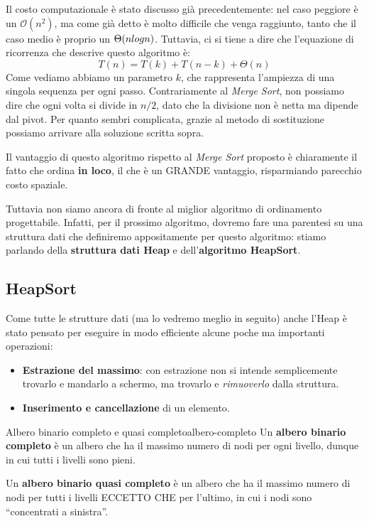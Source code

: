 \documentclass[12pt]{report}
\begin{document}
    Il costo computazionale è stato discusso già precedentemente: nel caso peggiore è un $\mathcal{O}(n^2)$, ma come già detto è molto difficile che venga raggiunto, tanto che il caso medio è proprio un $\Theta(n \\log n)$. Tuttavia, ci si tiene a dire che l'equazione di ricorrenza che descrive questo algoritmo è:
    \[
    T(n) = T(k) + T(n-k) + \Theta(n)
    \]
    Come vediamo abbiamo un parametro $k$, che rappresenta l'ampiezza di una singola sequenza per ogni passo. Contrariamente al \textit{Merge Sort}, non possiamo dire che ogni volta si divide in $n/2$, dato che la divisione non è netta ma dipende dal pivot. Per quanto sembri complicata, grazie al metodo di sostituzione possiamo arrivare alla soluzione scritta sopra.
    
    Il vantaggio di questo algoritmo rispetto al \textit{Merge Sort} proposto è chiaramente il fatto che ordina \textbf{in loco}, il che è un GRANDE vantaggio, risparmiando parecchio costo spaziale.
    
    Tuttavia non siamo ancora di fronte al miglior algoritmo di ordinamento progettabile. Infatti, per il prossimo algoritmo, dovremo fare una parentesi su una struttura dati che definiremo appositamente per questo algoritmo: stiamo parlando della \textbf{struttura dati Heap} e dell’\textbf{algoritmo HeapSort}.
    
    \subsection{HeapSort}
    Come tutte le strutture dati (ma lo vedremo meglio in seguito) anche l'Heap è stato pensato per eseguire in modo efficiente alcune poche ma importanti operazioni:
    \begin{itemize}
    	\item \textbf{Estrazione del massimo}: con estrazione non si intende semplicemente trovarlo e mandarlo a schermo, ma trovarlo e \textit{rimuoverlo} dalla struttura.
    	\item \textbf{Inserimento e cancellazione} di un elemento.
    \end{itemize}
    
    \begin{definizione}{Albero binario completo e quasi completo}{albero-completo}
    	Un \textbf{albero binario completo} è un albero che ha il massimo numero di nodi per ogni livello, dunque in cui tutti i livelli sono pieni. 
    	
    	Un \textbf{albero binario quasi completo} è un albero che ha il massimo numero di nodi per tutti i livelli ECCETTO CHE per l'ultimo, in cui i nodi sono ``concentrati a sinistra''.
    \end{definizione}
    
\end{document}
